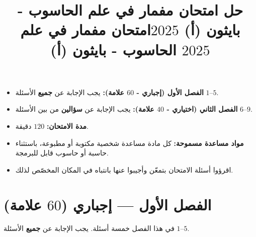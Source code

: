 \documentclass[14pt]{extarticle}
\title{حل امتحان مفمار في علم الحاسوب - بايثون (أ) $2025$}
\title{امتحان مفمار في علم الحاسوب - بايثون (أ) $2025$}
\begin{document}
\maketitle
\thispagestyle{fancy}

\ifwithsols
\else
\begin{boxCode}
\begin{itemize}[nosep]
    \item \textbf{الفصل الأول (إجباري - $60$ علامة):} يجب الإجابة عن \textbf{جميع} الأسئلة $1$–$5$.
    \item \textbf{الفصل الثاني (اختياري - $40$ علامة):} يجب الإجابة عن \textbf{سؤالين} من بين الأسئلة $6$–$9$.
    \item \textbf{مدة الامتحان:} $120$ دقيقة.
    \item \textbf{مواد مساعدة مسموحة:} كل مادة مساعدة شخصية مكتوبة أو مطبوعة، باستثناء حاسبة أو حاسوب قابل للبرمجة.
    \item اقرؤوا أسئلة الامتحان بتمعّن وأجيبوا عنها بانتباه في المكان المخصّص لذلك.
\end{itemize}
\end{boxCode}
\fi

\section*{الفصل الأول — إجباري ($60$ علامة)}
في هذا الفصل خمسة أسئلة. يجب الإجابة عن \textbf{جميع} الأسئلة $1$–$5$.
\end{document}
